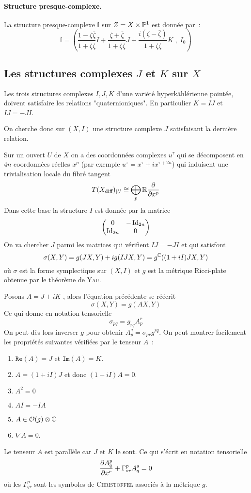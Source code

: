\documentclass[12pt,draft]{article}
\renewcommand{\Re}{\texttt{Re}}
\renewcommand{\Im}{\texttt{Im}}
\begin{document}
\paragraph*{Structure presque-complexe.}La structure presque-complexe $\mathbb{I}$ sur $Z = X \times \mathbb{P}^1$ est donnée par~:
\[
\mathbb{I} = \left(
\dfrac{1-\zeta \bar{\zeta}}{1+\zeta \bar{\zeta}}I + \dfrac{\zeta + \bar{\zeta}}{1+\zeta \bar{\zeta}}J + \dfrac{i(\zeta - \bar{\zeta})}{1+\zeta \bar{\zeta}}K \; , \; I_0
\right)
\]



\subsection{Les structures complexes $J$ et $K$ sur $X$}
Les trois structures complexes $I,J,K$ d'une variété hyperkählérienne pointée, doivent satisfaire les relations "quaternioniques". En particulier $K = IJ$ et $IJ = -JI$.

On cherche donc sur $(X,I)$ une structure complexe $J$ satisfaisant la dernière relation.

Sur un ouvert $U$ de $X$ on a des coordonnées complexes $u^\tau$ qui se décomposent en $4n$ coordonnées réelles $x^p$ (par exemple $u^\tau = x^\tau + i x^{\tau+2n}$) qui induisent une trivialisation locale du fibré tangent \[
T(X_\text{diff})_{\vert U} \cong \bigoplus_p \mathbb{R} \dfrac{\partial{}}{\partial{x^p}}
\]
Dans cette base la structure $I$ est donnée par la matrice
\[
\begin{pmatrix}
0 & -\operatorname{Id}_{2n} \\ 
\operatorname{Id}_{2n} & 0
\end{pmatrix} 
\]
On va chercher $J$ parmi les matrices qui vérifient $IJ=-JI$ et qui satisfont
\begin{equation}\label{symplecticJ}
\sigma(X,Y) = g(JX,Y) + ig(IJX,Y) = g^{\mathbb{C}}((1+iI)JX,Y)
\end{equation}
où $\sigma$ est la forme symplectique sur $(X,I)$ et $g$ est la métrique Ricci-plate obtenue par le théorème de \textsc{Yau}.

Posons $A = J + iK$ \label{A}, alors l'équation précédente se réécrit
\[
\sigma(X,Y) = g(AX,Y)
\]
Ce qui donne en notation tensorielle
\[
\sigma_{pq} = g_{rq}A^r_p
\]
On peut dès lors inverser $g$ pour obtenir $A_p^q = \sigma_{pr}g^{rq}$. On peut montrer facilement les propriétés suivantes vérifiées par le tenseur $A$~:
\begin{enumerate}
\item $\Re(A) = J$ et $\Im(A) = K$.\label{eqJ}
\item $A = (1 + iI)J$ et donc $(1-iI)A = 0$. \label{Aproj}
\item $A^2  = 0$
\item $AI =  -IA$
\item $A \in \mathcal{O}(g) \otimes \mathbb{C} $\label{Aorthoplex} 
\item $\nabla A = 0$.
\end{enumerate}
Le tenseur $A$ est parallèle car $J$ et $K$ le sont. Ce qui s'écrit en notation tensorielle
\[
\dfrac{\partial{A^p_q}}{\partial{x^r}} + \Gamma^p_{sr} A^s_q = 0
\]
où les $\Gamma^p_{qr}$ sont les symboles de \textsc{Christoffel} associés à la métrique $g$.
\end{document}
